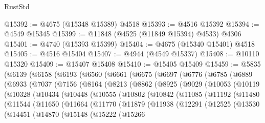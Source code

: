 \begin{lexlean}{RustStd}
\begin{coremodule}
@15392 := @4675 (@15348 @15389) @4518
@15393 := @4516 @15392
@15394 := @4549 @15345
@15399 := @11848 (@4525 (@11849 @15394) @4533) @4306
@15401 := @4740 (@15393 @15399)
@15404 := @4675 (@15340 @15401) @4518
@15405 := @4516 @15404
@15407 := @4944 (@4549 @15337)
@15408 := @10110 @15320
@15409 := @15407 @15408
@15410 := @15405 @15409
@15459 := @5835
    (@6139
      (@6158
        (@6193
          (@6560
            (@6661
              (@6675
                (@6697
                  (@6776
                    (@6785
                      (@6889
                        (@6933
                          (@7037
                            (@7156
                              (@8164
                                (@8213
                                  (@8862
                                    (@8925
                                      (@9029
                                        (@10053
                                          (@10119
                                            (@10328
                                              (@10434
                                                (@10448
                                                  (@10555
                                                    (@10802
                                                      (@10842
                                                        (@11085
                                                          (@11192
                                                            (@11480
                                                              (@11544
                                                                (@11650
                                                                  (@11664
                                                                    (@11770
                                                                      (@11879
                                                                        (@11938
                                                                          (@12291
                                                                            (@12525
                                                                              (@13530
                                                                                (@14451
                                                                                  (@14870
                                                                                    (@15148
                                                                                      (@15222
                                                                                        (@15266

\end{coremodule}
\end{lexlean}
